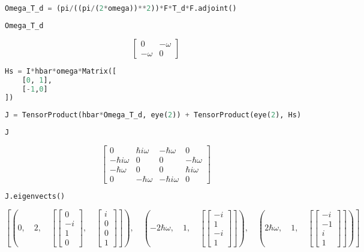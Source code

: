 \begin{lstlisting}[language=Python]
Omega_T_d = (pi/((pi/(2*omega))**2))*F*T_d*F.adjoint()
\end{lstlisting}

\begin{lstlisting}[language=Python]
Omega_T_d
\end{lstlisting}

\[\left[\begin{matrix}0 & - \omega\\- \omega & 0\end{matrix}\right]\]

\begin{lstlisting}[language=Python]
Hs = I*hbar*omega*Matrix([
    [0, 1],
    [-1,0]
])
\end{lstlisting}

\begin{lstlisting}[language=Python]
J = TensorProduct(hbar*Omega_T_d, eye(2)) + TensorProduct(eye(2), Hs)
\end{lstlisting}

\begin{lstlisting}[language=Python]
J
\end{lstlisting}

\[\left[\begin{matrix}0 & \hbar i \omega & - \hbar \omega & 0\\- \hbar i \omega & 0 & 0 & - \hbar \omega\\- \hbar \omega & 0 & 0 & \hbar i \omega\\0 & - \hbar \omega & - \hbar i \omega & 0\end{matrix}\right]\]

\begin{lstlisting}[language=Python]
J.eigenvects()
\end{lstlisting}

\[\left [ \left ( 0, \quad 2, \quad \left [ \left[\begin{matrix}0\\- i\\1\\0\end{matrix}\right], \quad \left[\begin{matrix}i\\0\\0\\1\end{matrix}\right]\right ]\right ), \quad \left ( - 2 \hbar \omega, \quad 1, \quad \left [ \left[\begin{matrix}- i\\1\\- i\\1\end{matrix}\right]\right ]\right ), \quad \left ( 2 \hbar \omega, \quad 1, \quad \left [ \left[\begin{matrix}- i\\-1\\i\\1\end{matrix}\right]\right ]\right )\right ]\]

